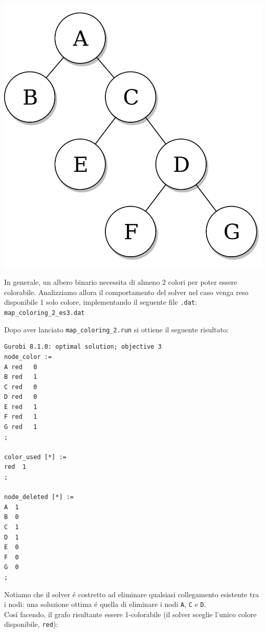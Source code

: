 \documentclass{article}
\begin{document}
\begin{center}
\includegraphics[scale=0.2]{tree.png}
\end{center}

In generale, un albero binario necessita di almeno 2 colori per poter essere colorabile. Analizziamo allora il comportamento del solver nel caso venga reso disponibile 1 solo colore, implementando il seguente file \texttt{.dat}:\\

\vspace{5mm}
\texttt{map\_coloring\_2\_es3.dat}

\vspace{5mm}

Dopo aver lanciato \texttt{map\_coloring\_2.run} si ottiene il seguente risultato:\\

\begin{verbatim}
Gurobi 8.1.0: optimal solution; objective 3
node_color :=
A red   0
B red   1
C red   0
D red   0
E red   1
F red   1
G red   1
;

color_used [*] :=
red  1
;

node_deleted [*] :=
A  1
B  0
C  1
D  1
E  0
F  0
G  0
;
\end{verbatim}

Notiamo che il solver \'e costretto ad eliminare qualsiasi collegamento esistente tra i nodi: una soluzione ottima \'e quella di eliminare i nodi \texttt{A}, \texttt{C} e \texttt{D}.\\
Cos\'i facendo, il grafo risultante essere 1-colorabile (il solver sceglie l'unico colore disponibile, \texttt{red}):
\end{document}
